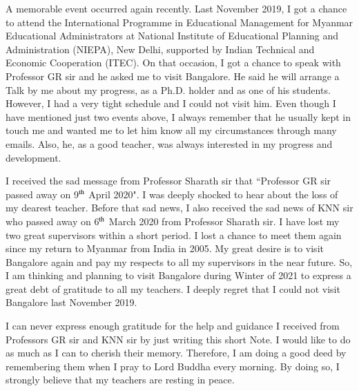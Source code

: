 A memorable event occurred again recently. Last November 2019, I got a chance to attend the International Programme in Educational Management for Myanmar Educational Administrators at National Institute of Educational Planning and Administration (NIEPA), New Delhi, supported by Indian Technical and Economic Cooperation (ITEC). On that occasion, I got a chance to speak with Professor GR sir and he asked me to visit Bangalore. He said he will arrange a Talk by me about my progress, as a Ph.D. holder and as one of his students. However, I had a very tight schedule and I could not visit him. Even though I have mentioned just two events above, I always remember that he usually kept in touch me and wanted me to let him know all my circumstances through many emails. Also, he, as a good teacher, was always interested in my progress and development. 

I received the sad message from Professor Sharath sir that ``Professor GR sir passed away on 9$^{\rm th}$ April 2020". I was deeply shocked to hear about the loss of my dearest teacher. Before that sad news, I also received the sad news of KNN sir who passed away on 6$^{\rm th}$ March 2020 from Professor Sharath sir. I have lost my two great supervisors within a short period. I lost a chance to meet them again since my return to Myanmar from India in 2005. My great desire is to visit Bangalore again and pay my respects to all my supervisors in the near future. So, I am thinking and planning to visit Bangalore during Winter of 2021 to express a great debt of gratitude to all my teachers. I deeply regret that I could not visit Bangalore last November 2019. 

I can never express enough gratitude for the help and guidance I received from Professors GR sir and KNN sir by just writing this short Note. I would like to do as much as I can to cherish their memory. Therefore, I am doing a good deed by remembering them when I pray to Lord Buddha every morning. By doing so, I strongly believe that my teachers are resting in peace. 
\vspace{1cm}

\drawline
\bigskip
\bigskip


